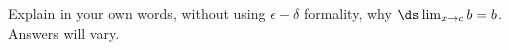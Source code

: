 {Explain in your own words, without using $\epsilon-\delta$ formality, why $\ds \lim_{x\to c} b = b$.}
{Answers will vary.
}
